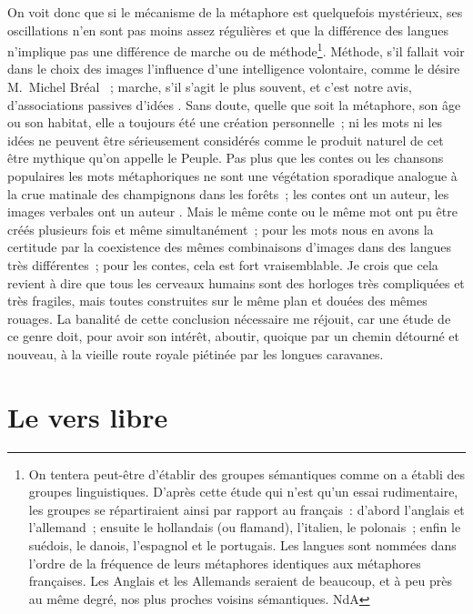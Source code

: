 \documentclass[french,twoside]{book} %
\newcommand\chapteropen{} %
\newcommand\chaptercont{} %
\newcommand\chapterclose{} %
\begin{document}
On voit donc que si le mécanisme de la métaphore est quelquefois mystérieux, ses oscillations n’en sont pas moins assez régulières et que la différence des langues n’implique pas une différence de marche ou de méthode\footnote{ On tentera peut-être d’établir des groupes sémantiques comme on a établi des groupes linguistiques. D’après cette étude qui n’est qu’un essai rudimentaire, les groupes se répartiraient ainsi par rapport au français : d’abord l’anglais et l’allemand ; ensuite le hollandais (ou flamand), l’italien, le polonais ; enfin le suédois, le danois, l’espagnol et le portugais. Les langues sont nommées dans l’ordre de la fréquence de leurs métaphores identiques aux métaphores françaises. Les Anglais et les Allemands seraient de beaucoup, et à peu près au même degré, nos plus proches voisins sémantiques. NdA}. Méthode, s’il fallait voir dans le choix des images l’influence d’une intelligence volontaire, comme le désire M. Michel Bréal  ; marche, s’il s’agit le plus souvent, et c’est notre avis, d’associations passives d’idées . Sans doute, quelle que soit la métaphore, son âge ou son habitat, elle a toujours été une création personnelle ; ni les mots ni les idées ne peuvent être sérieusement considérés comme le produit naturel de cet être mythique qu’on appelle le Peuple. Pas plus que les contes ou les chansons populaires les mots métaphoriques ne sont une végétation sporadique analogue à la crue matinale des champignons dans les forêts ; les contes ont un auteur, les images verbales ont un auteur . Mais le même conte ou le même mot ont pu être créés plusieurs fois et même simultanément ; pour les mots nous en avons la certitude par la coexistence des mêmes combinaisons d’images dans des langues très différentes ; pour les contes, cela est fort vraisemblable. Je crois que cela revient à dire que tous les cerveaux humains sont des horloges très compliquées et très fragiles, mais toutes construites sur le même plan et douées des mêmes rouages. La banalité de cette conclusion nécessaire me réjouit, car une étude de ce genre doit, pour avoir son intérêt, aboutir, quoique par un chemin détourné et nouveau, à la vieille route royale piétinée par les longues caravanes.
\chapterclose


\chapteropen
\chapter[{Le vers libre}]{Le vers libre }\renewcommand{\leftmark}{Le vers libre }


\chaptercont
\end{document}
